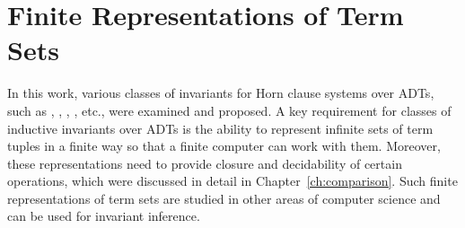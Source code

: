 \section{Finite Representations of Term Sets}\label{sec:relatedWork/modelBuilding}
In this work, various classes of invariants for Horn clause systems over ADTs, such as \elemclass{}, \regclass{}, \syncRegFlatClass{}, \syncRegFullClass{}, etc., were examined and proposed. A key requirement for classes of inductive invariants over ADTs is the ability to represent infinite sets of term tuples in a finite way so that a finite computer can work with them. Moreover, these representations need to provide closure and decidability of certain operations, which were discussed in detail in Chapter~\ref{ch:comparison}. Such finite representations of term sets are studied in other areas of computer science and can be used for invariant inference.

